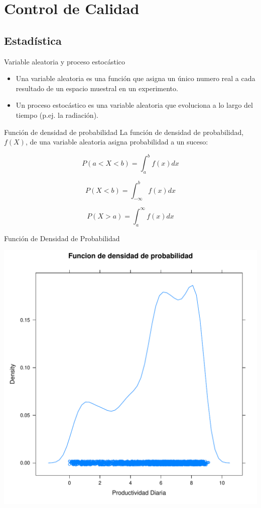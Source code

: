 \documentclass[xcolor={usenames,svgnames,dvipsnames}]{beamer}
\begin{document}
\section{Control de Calidad}
\label{sec:orgd87e08c}

\subsection{Estadística}
\label{sec:org6e84eac}


\begin{frame}[label={sec:org7916367}]{Variable aleatoria y proceso estocástico}
\begin{itemize}
\item Una \alert{variable aleatoria} es una función que asigna un único numero
real a cada resultado de un espacio muestral en un experimento.
\item Un \alert{proceso estocástico} es una variable aleatoria que evoluciona a
lo largo del \alert{tiempo} (p.ej. la radiación).
\end{itemize}
\end{frame}


\begin{frame}[label={sec:org3b7ff94}]{Función de densidad de probabilidad}
La función de densidad de probabilidad, \(f(X)\), de una variable
aleatoria \alert{asigna probabilidad} a un suceso:


\[
P(a<X<b)=\int_{a}^{b}f(x)dx
\]


\[
P(X<b)=\int_{-\infty}^{b}f(x)dx\]


\[
P(X>a)=\int_{a}^{\infty}f(x)dx\]
\end{frame}


\begin{frame}[label={sec:org059360b}]{Función de Densidad de Probabilidad}
\begin{center}
\includegraphics[width=.9\linewidth]{../figs/FuncionDensidadProbabilidad.pdf}
\end{center}
\end{frame}
\end{document}
